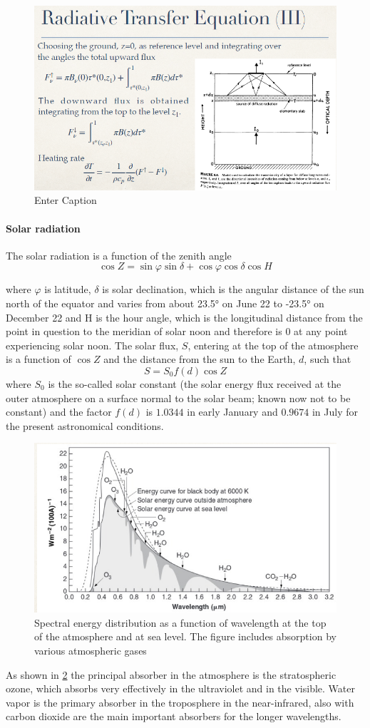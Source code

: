 \begin{figure}[htpb]
    \centering
    \includegraphics[width=0.5\linewidth]{uploads/18image.png}
    \caption{Enter Caption}
    \label{fig:enter-label}
\end{figure}

\paragraph{Solar radiation} The solar radiation is a function of the zenith angle
$$\cos Z = \sin \varphi \sin \delta + \cos \varphi \cos \delta \cos H$$

where $\varphi$ is latitude, $\delta$ is solar declination, which is the angular distance of the sun north of the equator and varies from about 23.5° on June 22 to -23.5° on December 22 and H is the hour angle, which is the longitudinal distance from the point in question to the meridian of solar noon and therefore is 0 at any point experiencing solar noon.
The solar flux, $S$, entering at the top of the atmosphere is a function of $\cos Z$ and the distance from the sun to the Earth, $d$, such that
$$S = S_0 f(d) \cos Z$$
where $S_{0}$ is the so-called solar constant (the solar energy flux received at the outer atmosphere on a surface normal to the solar beam; known now not to be constant) and the factor $f(d)$ is $1.0344$ in early January and $0.9674$ in July for the present astronomical conditions.
\begin{figure}[htp!]
    \centering
    \includegraphics[width=0.5\linewidth]{uploads/image12.png}
    \caption{Spectral energy distribution as a function of wavelength at the top of the atmosphere and at sea level. The figure includes absorption by various atmospheric gases}
    \label{fig1}

\end{figure}
As shown in \ref{fig1} the principal absorber in the atmosphere is the stratospheric ozone, which absorbs very effectively in the ultraviolet and in the visible. Water vapor is the primary absorber in the troposphere in the near-infrared, also with carbon dioxide are the main important absorbers for the longer wavelengths.

